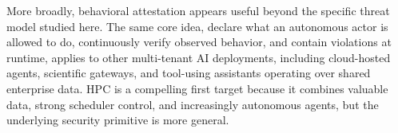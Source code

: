 More broadly, behavioral attestation appears useful beyond the specific threat
model studied here. The same core idea, declare what an autonomous actor is
allowed to do, continuously verify observed behavior, and contain violations at
runtime, applies to other multi-tenant AI deployments, including cloud-hosted
agents, scientific gateways, and tool-using assistants operating over shared
enterprise data. HPC is a compelling first target because it combines valuable
data, strong scheduler control, and increasingly autonomous agents, but the
underlying security primitive is more general.
